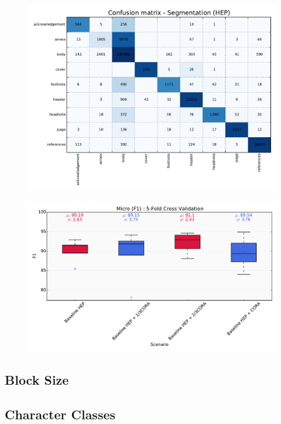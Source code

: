 \begin{figure}[h]
\center
\includegraphics[width=5.5in]{Figures/segmentation_baseline_confusion.pdf}
\caption{}
\label{fig:segmentation_baseline_confusion}
\end{figure}

\begin{figure}[h]
\center
\includegraphics[width=5.5in]{Figures/micro_subsampling.pdf}
\caption{}
\label{fig:references}
\end{figure}


\subsection{Block Size}

\subsection{Character Classes}

